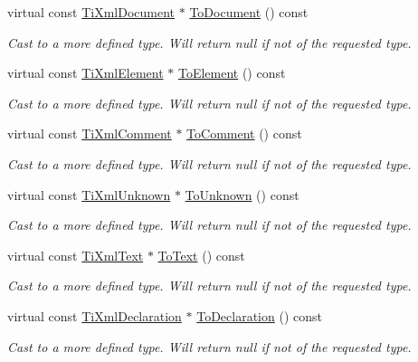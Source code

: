 \begin{DoxyCompactItemize}
virtual const \hyperlink{class_ti_xml_document}{Ti\+Xml\+Document} $\ast$ \hyperlink{class_ti_xml_node_a775a904618cad6e4a8049bda4f5a6aa9}{To\+Document} () const
\begin{DoxyCompactList}\small\item\em Cast to a more defined type. Will return null if not of the requested type. \end{DoxyCompactList}\item 
virtual const \hyperlink{class_ti_xml_element}{Ti\+Xml\+Element} $\ast$ \hyperlink{class_ti_xml_node_a4080428f2cac46e92ef4d284202fad0b}{To\+Element} () const
\begin{DoxyCompactList}\small\item\em Cast to a more defined type. Will return null if not of the requested type. \end{DoxyCompactList}\item 
virtual const \hyperlink{class_ti_xml_comment}{Ti\+Xml\+Comment} $\ast$ \hyperlink{class_ti_xml_node_a5ad43b9d545315e9bb4f50d4cb70de9e}{To\+Comment} () const
\begin{DoxyCompactList}\small\item\em Cast to a more defined type. Will return null if not of the requested type. \end{DoxyCompactList}\item 
virtual const \hyperlink{class_ti_xml_unknown}{Ti\+Xml\+Unknown} $\ast$ \hyperlink{class_ti_xml_node_ab4f2e6ce87d36c1b9b7de2529128a460}{To\+Unknown} () const
\begin{DoxyCompactList}\small\item\em Cast to a more defined type. Will return null if not of the requested type. \end{DoxyCompactList}\item 
virtual const \hyperlink{class_ti_xml_text}{Ti\+Xml\+Text} $\ast$ \hyperlink{class_ti_xml_node_a2591700660b308571c09166559a39332}{To\+Text} () const
\begin{DoxyCompactList}\small\item\em Cast to a more defined type. Will return null if not of the requested type. \end{DoxyCompactList}\item 
virtual const \hyperlink{class_ti_xml_declaration}{Ti\+Xml\+Declaration} $\ast$ \hyperlink{class_ti_xml_node_a0dc0831e89d499ca911a3be61a413d45}{To\+Declaration} () const
\begin{DoxyCompactList}\small\item\em Cast to a more defined type. Will return null if not of the requested type. \end{DoxyCompactList}\item 

\end{DoxyCompactItemize}
